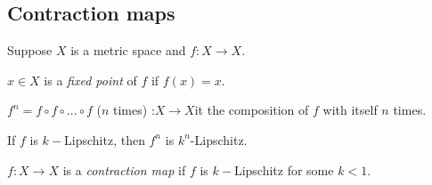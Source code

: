 \documentclass[a4paper]{article}
\begin{document}
\subsection{Contraction maps}
Suppose $X$ is a metric space and $f:X \to X$.

\begin{defi}
$x \in X$ is a \emph{fixed point} of $f$ if $f\left(x\right) = x$.
\end{defi}

\begin{defi}
$f^n = f\circ f\circ ...\circ f$ ($n$ times) :$X\to X$it the composition of $f$ with itself $n$ times.
\end{defi}

If $f$ is $k-$Lipschitz, then $f^n$ is $k^n$-Lipschitz.

\begin{defi}
$f:X\to X$ is a \emph{contraction map} if $f$ is $k-$Lipschitz for some $k<1$.
\end{defi}
\end{document}
